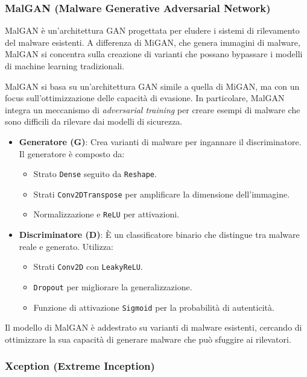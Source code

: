 \subsubsection{MalGAN (Malware Generative Adversarial Network)}

MalGAN è un'architettura GAN progettata per eludere i sistemi di rilevamento del malware esistenti. A differenza di MiGAN, che genera immagini di malware, MalGAN si concentra sulla creazione di varianti che possano bypassare i modelli di machine learning tradizionali.

MalGAN si basa su un'architettura GAN simile a quella di MiGAN, ma con un focus sull'ottimizzazione delle capacità di evasione. In particolare, MalGAN integra un meccanismo di \textit{adversarial training} per creare esempi di malware che sono difficili da rilevare dai modelli di sicurezza.
\begin{itemize}
    \item \textbf{Generatore (G)}: Crea varianti di malware per ingannare il discriminatore. Il generatore è composto da:
    \begin{itemize}
        \item Strato \texttt{Dense} seguito da \texttt{Reshape}.
        \item Strati \texttt{Conv2DTranspose} per amplificare la dimensione dell'immagine.
        \item Normalizzazione e \texttt{ReLU} per attivazioni.
    \end{itemize}
    \item \textbf{Discriminatore (D)}: È un classificatore binario che distingue tra malware reale e generato. Utilizza:
    \begin{itemize}
        \item Strati \texttt{Conv2D} con \texttt{LeakyReLU}.
        \item \texttt{Dropout} per migliorare la generalizzazione.
        \item Funzione di attivazione \texttt{Sigmoid} per la probabilità di autenticità.
    \end{itemize}
\end{itemize}
Il modello di MalGAN è addestrato su varianti di malware esistenti, cercando di ottimizzare la sua capacità di generare malware che può sfuggire ai rilevatori.

\subsubsection{Xception (Extreme Inception)}

